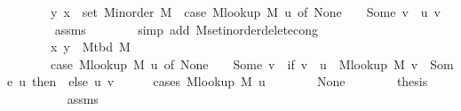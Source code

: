 \begin{isabellebody}
\ \ \ \ \ \ \ {\isacharparenleft}{\kern0pt}y{\isacharcomma}{\kern0pt}\ x{\isacharparenright}{\kern0pt}\ {\isasymin}\ set\ {\isacharparenleft}{\kern0pt}M{\isacharunderscore}{\kern0pt}inorder\ M{\isacharparenright}{\kern0pt}\ {\isacharminus}{\kern0pt}\ {\isacharparenleft}{\kern0pt}case\ M{\isacharunderscore}{\kern0pt}lookup\ M\ u\ of\ None\ {\isasymRightarrow}\ {\isacharbraceleft}{\kern0pt}{\isacharbraceright}{\kern0pt}\ {\isacharbar}{\kern0pt}\ Some\ v\ {\isasymRightarrow}\ {\isacharbraceleft}{\kern0pt}{\isacharparenleft}{\kern0pt}u{\isacharcomma}{\kern0pt}\ v{\isacharparenright}{\kern0pt}{\isacharbraceright}{\kern0pt}{\isacharparenright}{\kern0pt}{\isachardoublequoteclose}\isanewline
\ \ \ \ \ \ \isamarkupfalse%
\ assms\isanewline
\ \ \ \ \ \ \isamarkupfalse%
\ {\isacharparenleft}{\kern0pt}simp\ add{\isacharcolon}{\kern0pt}\ M{\isachardot}{\kern0pt}set{\isacharunderscore}{\kern0pt}inorder{\isacharunderscore}{\kern0pt}delete{\isacharunderscore}{\kern0pt}cong{\isacharparenright}{\kern0pt}\isanewline
\ \ \ \ \isamarkupfalse%
\ \isamarkupfalse%
\isanewline
\ \ \ \ \ \ {\isachardoublequoteopen}{\isachardot}{\kern0pt}{\isachardot}{\kern0pt}{\isachardot}{\kern0pt}\ {\isasymlongleftrightarrow}\isanewline
\ \ \ \ \ \ \ {\isacharbraceleft}{\kern0pt}x{\isacharcomma}{\kern0pt}\ y{\isacharbraceright}{\kern0pt}\ {\isasymin}\ M{\isacharunderscore}{\kern0pt}tbd\ M\ {\isacharminus}{\kern0pt}\isanewline
\ \ \ \ \ \ \ {\isacharparenleft}{\kern0pt}case\ M{\isacharunderscore}{\kern0pt}lookup\ M\ u\ of\ None\ {\isasymRightarrow}\ {\isacharbraceleft}{\kern0pt}{\isacharbraceright}{\kern0pt}\ {\isacharbar}{\kern0pt}\ Some\ v\ {\isasymRightarrow}\ if\ v\ {\isasymnoteq}\ u\ {\isasymand}\ M{\isacharunderscore}{\kern0pt}lookup\ M\ v\ {\isacharequal}{\kern0pt}\ Some\ u\ then\ {\isacharbraceleft}{\kern0pt}{\isacharbraceright}{\kern0pt}\ else\ {\isacharbraceleft}{\kern0pt}{\isacharbraceleft}{\kern0pt}u{\isacharcomma}{\kern0pt}\ v{\isacharbraceright}{\kern0pt}{\isacharbraceright}{\kern0pt}{\isacharparenright}{\kern0pt}{\isachardoublequoteclose}\isanewline
\ \ \ \ \isamarkupfalse%
\ {\isacharparenleft}{\kern0pt}cases\ {\isachardoublequoteopen}M{\isacharunderscore}{\kern0pt}lookup\ M\ u{\isachardoublequoteclose}{\isacharparenright}{\kern0pt}\isanewline
\ \ \ \ \ \ \isamarkupfalse%
\ None\isanewline
\ \ \ \ \ \ \isamarkupfalse%
\ {\isacharquery}{\kern0pt}thesis\isanewline
\ \ \ \ \ \ \ \ \isamarkupfalse%
\ assms\isanewline
\ \ \ \ \ \ \ \ \isamarkupfalse%

\end{isabellebody}
